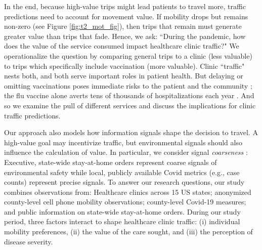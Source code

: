  In the end, because high-value trips might lead patients to travel more, traffic predictions need to account for movement value. If mobility drops but remains non-zero (see Figure \ref{fig:t2_mot_fig}), then trips that remain must generate greater value than trips that fade. Hence, we ask: “During the pandemic, how does the value of the service consumed impact healthcare clinic traffic?" We operationalize the question by comparing general trips to a clinic (less valuable) to trips which specifically include vaccination (more valuable). Clinic “traffic" nests both, and both serve important roles in patient health. But delaying or omitting vaccinations poses immediate risks to the patient and the community \citep{Salmon2015,Brewer2017}; the flu vaccine alone averts tens of thousands of hospitalizations each year \citep{CDC2020_flu}. And so we examine the pull of different services and discuss the implications for clinic traffic predictions. 

 Our approach also models how information signals shape the decision to travel. A high-value goal may incentivize traffic, but environmental signals should also influence the calculation of value. In particular, we consider signal \textit{coarseness} \citep{Morris2007}: Executive, state-wide stay-at-home orders represent coarse signals of environmental safety while local, publicly available Covid metrics (e.g., case counts) represent precise signals. To answer our research questions, our study combines observations from: Healthcare clinics across 15 US states; anonymized county-level cell phone mobility observations; county-level Covid-19 measures; and public information on state-wide stay-at-home orders. During our study period, three factors interact to shape healthcare clinic traffic: (i) individual mobility preferences, (ii) the value of the care sought, and (iii) the perception of disease severity.
 
